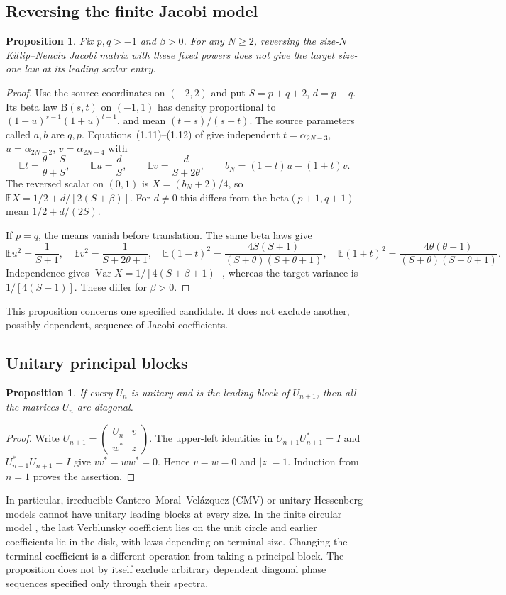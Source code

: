 \documentclass[10pt]{amsart}
\newtheorem{proposition}[theorem]{Proposition}
\DeclareMathOperator{\Var}{Var}
\newcommand{\E}{\mathbb E}
\begin{document}
\subsection{Reversing the finite Jacobi model}
\begin{proposition}\label{prop:KN}
Fix $p,q>-1$ and $\beta>0$. For any $N\geq2$, reversing the
size-$N$ Killip--Nenciu Jacobi matrix with these fixed powers
does not give the target size-one law at its leading scalar entry.
\end{proposition}
\begin{proof}
Use the source coordinates on $(-2,2)$ and put
$S=p+q+2$, $d=p-q$. Its beta law $\mathrm B(s,t)$ on $(-1,1)$
has density proportional to $(1-u)^{s-1}(1+u)^{t-1}$, and mean
$(t-s)/(s+t)$. The source parameters called $a,b$ are $q,p$.
Equations~(1.11)--(1.12) of \cite{KN} give independent
$t=\alpha_{2N-3}$, $u=\alpha_{2N-2}$, $v=\alpha_{2N-4}$ with
\[
 \E t=\frac{\theta-S}{\theta+S},\qquad
 \E u=\frac dS,\qquad \E v=\frac d{S+2\theta},
 \qquad b_N=(1-t)u-(1+t)v.
\]
The reversed scalar on $(0,1)$ is $X=(b_N+2)/4$, so
$\E X=1/2+d/[2(S+\beta)]$.
For $d\ne0$ this differs from the beta$(p+1,q+1)$ mean
$1/2+d/(2S)$.

If $p=q$, the means vanish before translation. The same beta laws give
\[
 \E u^2=\frac1{S+1},\quad \E v^2=\frac1{S+2\theta+1},\quad
 \E(1-t)^2=\frac{4S(S+1)}{(S+\theta)(S+\theta+1)},\quad
 \E(1+t)^2=\frac{4\theta(\theta+1)}{(S+\theta)(S+\theta+1)}.
\]
Independence gives $\Var X=1/[4(S+\beta+1)]$, whereas the
target variance is $1/[4(S+1)]$. These differ for $\beta>0$.
\end{proof}
This proposition concerns one specified candidate. It does not
exclude another, possibly dependent, sequence of Jacobi coefficients.

\subsection{Unitary principal blocks}
\begin{proposition}\label{prop:unitary}
If every $U_n$ is unitary and is the leading block of $U_{n+1}$,
then all the matrices $U_n$ are diagonal.
\end{proposition}
\begin{proof}
Write $U_{n+1}=\left(\begin{smallmatrix}U_n&v\\w^*&z\end{smallmatrix}\right)$.
The upper-left identities in $U_{n+1}U_{n+1}^*=I$ and
$U_{n+1}^*U_{n+1}=I$ give $vv^*=ww^*=0$. Hence $v=w=0$
and $|z|=1$. Induction from $n=1$ proves the assertion.
\end{proof}
In particular, irreducible Cantero--Moral--Vel\'azquez (CMV) or unitary
Hessenberg models cannot
have unitary leading blocks at every size. In the finite circular
model \cite[Theorem~1]{KN}, the last Verblunsky coefficient lies
on the unit circle and earlier coefficients lie in the disk, with
laws depending on terminal size. Changing the terminal coefficient
is a different operation from taking a principal block.
The proposition does not by itself exclude arbitrary dependent
diagonal phase sequences specified only through their spectra.
\end{document}
